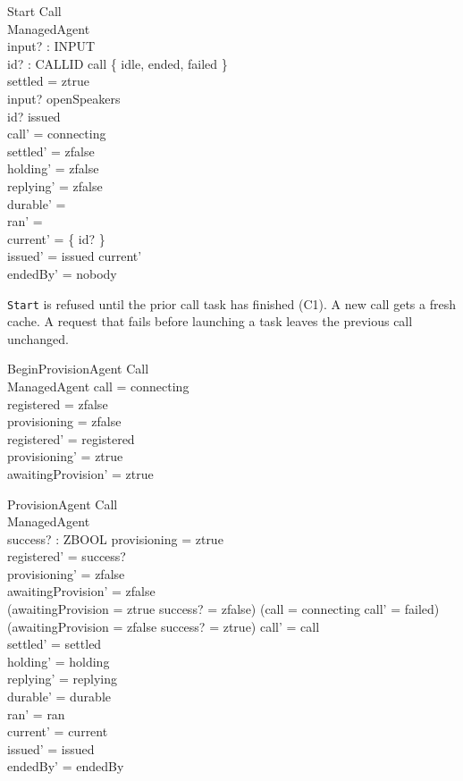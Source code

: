 \documentclass[a4paper,10pt,fleqn]{article}
\begin{document}
\begin{schema}{Start}
  \Delta Call \\
  \Xi ManagedAgent \\
  input? : INPUT \\
  id? : CALLID
\where
  call \in \{ idle, ended, failed \} \\
  settled = ztrue \\
  input? \neq openSpeakers \\
  id? \notin issued \\
  call' = connecting \\
  settled' = zfalse \\
  holding' = zfalse \\
  replying' = zfalse \\
  durable' = \emptyset \\
  ran' = \emptyset \\
  current' = \{ id? \} \\
  issued' = issued \cup current' \\
  endedBy' = nobody
\end{schema}

\texttt{Start} is refused until the prior call task has finished (C1).
A new call gets a fresh cache. A request that fails before launching a
task leaves the previous call unchanged.

\begin{schema}{BeginProvisionAgent}
  \Xi Call \\
  \Delta ManagedAgent
\where
  call = connecting \\
  registered = zfalse \\
  provisioning = zfalse \\
  registered' = registered \\
  provisioning' = ztrue \\
  awaitingProvision' = ztrue
\end{schema}

\begin{schema}{ProvisionAgent}
  \Delta Call \\
  \Delta ManagedAgent \\
  success? : ZBOOL
\where
  provisioning = ztrue \\
  registered' = success? \\
  provisioning' = zfalse \\
  awaitingProvision' = zfalse \\
  (awaitingProvision = ztrue \land success? = zfalse) \implies
    (call = connecting \land call' = failed) \\
  (awaitingProvision = zfalse \lor success? = ztrue) \implies call' = call \\
  settled' = settled \\
  holding' = holding \\
  replying' = replying \\
  durable' = durable \\
  ran' = ran \\
  current' = current \\
  issued' = issued \\
  endedBy' = endedBy
\end{schema}
\end{document}
